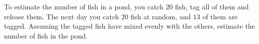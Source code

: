 To estimate the number of fish in a pond, you catch $20$ fish, tag all of them and release them. The next day you catch $20$ fish at random, and $13$ of them are tagged. Assuming the tagged fish have mixed evenly with the others, estimate the number of fish in the pond.
